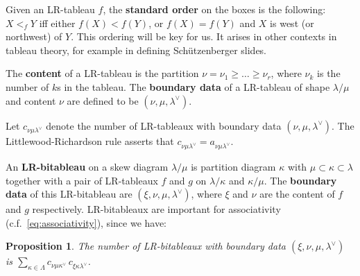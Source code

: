 \documentclass[12pt]{article}
\newtheorem{proposition}[lemma]{Proposition}
\begin{document}
Given an LR-tableau $f$, the {\bf standard order} on the boxes is the 
following: $X <_f Y$ iff either $f(X) < f(Y)$, or $f(X) = f(Y)$ and $X$
is west (or northwest) of $Y$.  This ordering will be key for us.  It
arises in other contexts in tableau theory, for example in
defining Sch\"utzenberger slides.

The {\bf content} of a LR-tableau is the partition $\nu = \nu_1 \geq \dots 
\geq \nu_r$, where $\nu_k$
is the number of $k$s in the tableau.  The {\bf boundary data} of
a LR-tableau of shape $\lambda/\mu$ and content $\nu$ are defined
to be $(\nu, \mu, \lambda^\vee)$.

Let $c_{\nu \mu \lambda^\vee}$ denote the number of LR-tableaux with
boundary data $(\nu, \mu, \lambda^\vee)$.  
The Littlewood-Richardson rule asserts that 
$c_{\nu \mu \lambda^\vee} = a_{\nu \mu \lambda^\vee}$.

An {\bf LR-bitableau} on a skew diagram $\lambda/\mu$
is partition diagram $\kappa$ with $\mu \subset \kappa \subset \lambda$
together with a pair of LR-tableaux $f$ and $g$ on 
$\lambda/\kappa$ and $\kappa/\mu$.  The {\bf boundary data} of this
LR-bitableau are $(\xi, \nu, \mu, \lambda^\vee)$, where $\xi$ and
$\nu$ are the content of $f$ and $g$ respectively.
LR-bitableaux are important for associativity
(c.f.~\eqref{eq:associativity}), since we have:
\begin{proposition}
\label{prop:countbitableaux}
The number of LR-bitableaux with boundary data 
$(\xi, \nu, \mu, \lambda^\vee)$ is 
$\sum_{\kappa \in \Lambda} c_{\nu \mu \kappa^\vee}\, c_{\xi \kappa \lambda^\vee}$.
\end{proposition}

\end{document}
